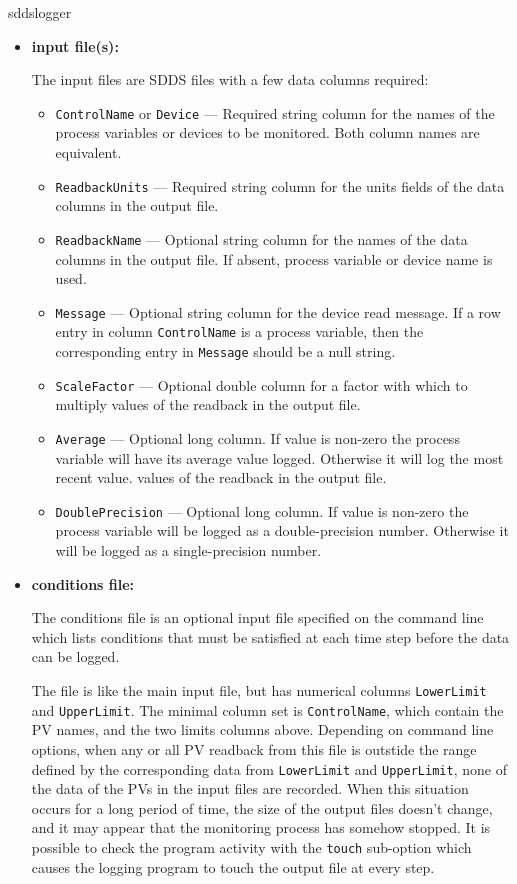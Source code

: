 \begin{sddsprog}{sddslogger}
\begin{itemize}
\item {\bf input file(s):}\par
The input files are SDDS files with a few data columns required:
\begin{itemize}
        \item {\tt ControlName} or {\tt Device} --- Required string column for the names of the process variables
                or devices to be monitored. Both column names are equivalent.
        \item {\tt ReadbackUnits} --- Required string column for the units fields of the data columns in the 
                output file.
        \item {\tt ReadbackName} --- Optional string column for the names of the data columns in the 
                output file. If absent, process variable or device name is used.
        \item {\tt Message} --- Optional string column for the device read message. If a row entry in
                column {\tt ControlName} is a process variable, then the corresponding entry
                in {\tt Message} should be a null string. 
        \item {\tt ScaleFactor} --- Optional double column for a factor with which to multiply
                values of the readback in the output file.
        \item {\tt Average} --- Optional long column.  If value is non-zero the process variable will have
	        its average value logged.  Otherwise it will log the most recent value.
                values of the readback in the output file.
        \item {\tt DoublePrecision} --- Optional long column. If value is non-zero the process variable 
	        will be logged as a double-precision number.  Otherwise it will be logged as a single-precision
	        number.
\end{itemize}

\item {\bf conditions file:} \par
The conditions file is an optional input file specified on the command line which lists
conditions that must be satisfied at each time step before the data can be logged.

The file is like the main input file, but has numerical columns \verb+LowerLimit+ and \verb+UpperLimit+.
The minimal column set is \verb+ControlName+, which contain the PV names, and the two limits columns above.
Depending on command line options, when any or all PV readback from this file
is outstide the range defined by the corresponding data from \verb+LowerLimit+ and \verb+UpperLimit+,
none of the data of the PVs in the input files are recorded. 
When this situation occurs for a long period of time, the size of the output files doesn't
change, and it may appear that the monitoring process has somehow stopped.
It is possible to check the program activity with the \verb+touch+ sub-option
which causes the logging program to touch the output file at every step.


\end{itemize}
\end{sddsprog}
